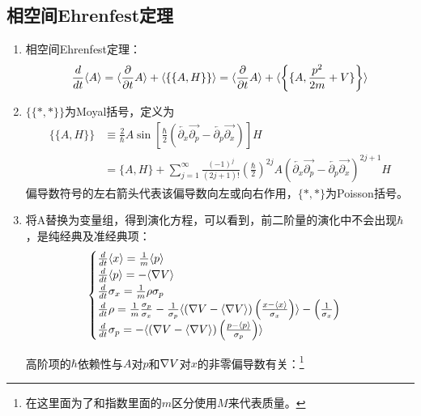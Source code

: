 \subsection{相空间Ehrenfest定理}
\begin{enumerate}
	\item 相空间Ehrenfest定理：
	\begin{equation}
	\frac{d}{dt}\langle A \rangle=\langle \frac{\partial}{\partial t} A \rangle+\langle \left\{\{A,H\}\right\} \rangle
	=\langle \frac{\partial}{\partial t} A \rangle+\langle \left\{\{A,\frac{p^2}{2 m}+V\}\right\} \rangle
	\end{equation}

	\item $\{\{*,*\}\}$为Moyal括号，定义为
	\begin{align}
	\{\{A,H\}\}&\equiv \frac{2}{\hbar}A \sin \left[\frac{\hbar}{2} (\overleftarrow{\partial_x}\overrightarrow{\partial_p}-\overleftarrow{\partial_p}\overrightarrow{\partial_x})\right]H\\
	&=\{A,H\}+\sum^\infty_{j=1}\frac{(-1)^j}{(2j+1)!}\left(\frac{\hbar}{2}\right)^{2j}A(\overleftarrow{\partial_x}\overrightarrow{\partial_p}-\overleftarrow{\partial_p}\overrightarrow{\partial_x})^{2j+1} H
	\end{align}
	偏导数符号的左右箭头代表该偏导数向左或向右作用，$\{*,*\}$为Poisson括号。

	\item 将A替换为变量组，得到演化方程，可以看到，前二阶量的演化中不会出现$\hbar$，是纯经典及准经典项：
	\begin{equation}
	\begin{cases}
	\frac{d}{dt}\langle x \rangle=\frac{1}{m}\langle p \rangle\\
	\frac{d}{dt}\langle p \rangle=-\langle \nabla V \rangle\\
	\frac{d}{dt}\sigma_x = \frac{1}{m}\rho \sigma_p\\
	\frac{d}{dt} \rho = \frac{1}{m}\frac{\sigma_p}{\sigma_x} - \frac{1}{\sigma_p} \langle (\nabla V- \langle \nabla V  \rangle)\left(\frac{x-\langle x \rangle}{\sigma_x}\right) \rangle-\left(\frac{1}{\sigma_x}\right)\\
	\frac{d}{dt}\sigma_p=- \langle (\nabla V-\langle \nabla V  \rangle)\left(\frac{p-\langle p \rangle}{\sigma_p}\right) \rangle
	\end{cases}
	\end{equation}

	高阶项的$\hbar$依赖性与$A$对$p$和$\nabla V$对$x$的非零偏导数有关：\footnote{在这里面为了和指数里面的$m$区分使用$M$来代表质量。}
	

\end{enumerate}
\vspace{-0.5cm}
